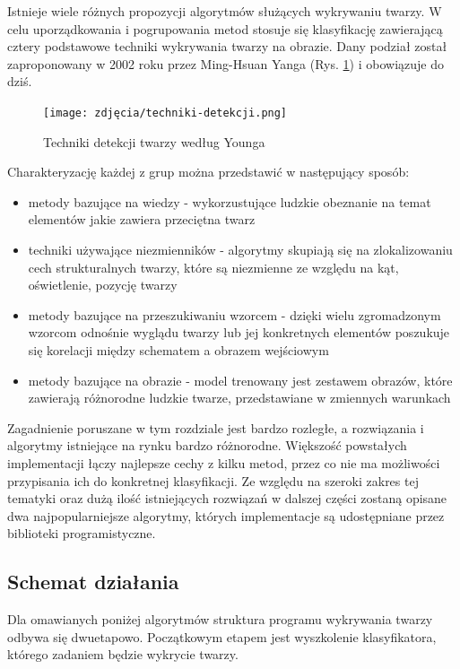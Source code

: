 Istnieje wiele różnych propozycji algorytmów służących wykrywaniu twarzy. W celu uporządkowania i pogrupowania metod stosuje się klasyfikację zawierającą cztery podstawowe techniki wykrywania twarzy na obrazie. Dany podział został zaproponowany w 2002 roku przez Ming-Hsuan Yanga (Rys. \ref{fig:detectionMethods}) i obowiązuje do dziś.

\begin{figure}[h]
	\centering
	\texttt{[image: zdjęcia/techniki-detekcji.png]}
	\caption{Techniki detekcji twarzy według Younga} 
	\label{fig:detectionMethods}
\end{figure}

Charakteryzację każdej z grup \cite{Yang} można przedstawić w następujący sposób:
\begin{itemize}
    \item metody bazujące na wiedzy - wykorzustujące ludzkie obeznanie na temat elementów jakie zawiera przeciętna twarz
    \item techniki używające niezmienników - algorytmy skupiają się na zlokalizowaniu cech strukturalnych twarzy, które są niezmienne ze względu na kąt, oświetlenie, pozycję twarzy
    \item metody bazujące na przeszukiwaniu wzorcem - dzięki wielu zgromadzonym wzorcom odnośnie wyglądu twarzy lub jej konkretnych elementów poszukuje się korelacji między schematem a obrazem wejściowym
    \item metody bazujące na obrazie - model trenowany jest zestawem obrazów, które zawierają różnorodne ludzkie twarze, przedstawiane w zmiennych warunkach
\end{itemize}

Zagadnienie poruszane w tym rozdziale jest bardzo rozległe, a rozwiązania i algorytmy istniejące na rynku bardzo różnorodne. Większość powstałych implementacji łączy najlepsze cechy z kilku metod, przez co nie ma możliwości przypisania ich do konkretnej klasyfikacji. Ze względu na szeroki zakres tej 
tematyki oraz dużą ilość istniejących rozwiązań w dalszej części zostaną opisane dwa najpopularniejsze algorytmy, których implementacje są udostępniane przez biblioteki programistyczne.


\subsection{Schemat działania}
Dla omawianych poniżej algorytmów struktura programu wykrywania twarzy odbywa się dwuetapowo. Początkowym etapem jest wyszkolenie klasyfikatora, którego zadaniem będzie wykrycie twarzy. 


